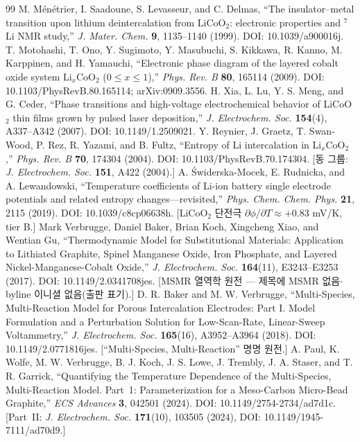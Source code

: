 \begin{thebibliography}{99}
 M. M\'en\'etrier, I. Saadoune, S. Levasseur, and C. Delmas, ``The insulator--metal transition upon lithium deintercalation from LiCoO$_2$: electronic properties and $^7$Li NMR study,'' \emph{J. Mater. Chem.} \textbf{9}, 1135--1140 (1999). DOI: 10.1039/a900016j.
 T. Motohashi, T. Ono, Y. Sugimoto, Y. Masubuchi, S. Kikkawa, R. Kanno, M. Karppinen, and H. Yamauchi, ``Electronic phase diagram of the layered cobalt oxide system Li$_x$CoO$_2$ ($0\le x\le1$),'' \emph{Phys. Rev. B} \textbf{80}, 165114 (2009). DOI: 10.1103/PhysRevB.80.165114; arXiv:0909.3556.
 H. Xia, L. Lu, Y. S. Meng, and G. Ceder, ``Phase transitions and high-voltage electrochemical behavior of LiCoO$_2$ thin films grown by pulsed laser deposition,'' \emph{J. Electrochem. Soc.} \textbf{154}(4), A337--A342 (2007). DOI: 10.1149/1.2509021.
 Y. Reynier, J. Graetz, T. Swan-Wood, P. Rez, R. Yazami, and B. Fultz, ``Entropy of Li intercalation in Li$_x$CoO$_2$,'' \emph{Phys. Rev. B} \textbf{70}, 174304 (2004). DOI: 10.1103/PhysRevB.70.174304. [동 그룹: \emph{J. Electrochem. Soc.} \textbf{151}, A422 (2004).]
 A. {\'S}widerska-Mocek, E. Rudnicka, and A. Lewandowski, ``Temperature coefficients of Li-ion battery single electrode potentials and related entropy changes---revisited,'' \emph{Phys. Chem. Chem. Phys.} \textbf{21}, 2115 (2019). DOI: 10.1039/c8cp06638h. [LiCoO$_2$ 단전극 $\partial\phi/\partial T\approx+0.83$ mV/K, tier B.]
 Mark Verbrugge, Daniel Baker, Brian Koch, Xingcheng Xiao, and Wentian Gu, ``Thermodynamic Model for Substitutional Materials: Application to Lithiated Graphite, Spinel Manganese Oxide, Iron Phosphate, and Layered Nickel-Manganese-Cobalt Oxide,'' \emph{J. Electrochem. Soc.} \textbf{164}(11), E3243--E3253 (2017). DOI: 10.1149/2.0341708jes. [MSMR 열역학 원전 --- 제목에 MSMR 없음$\cdot$byline 이니셜 없음(출판 표기).]
 D. R. Baker and M. W. Verbrugge, ``Multi-Species, Multi-Reaction Model for Porous Intercalation Electrodes: Part I. Model Formulation and a Perturbation Solution for Low-Scan-Rate, Linear-Sweep Voltammetry,'' \emph{J. Electrochem. Soc.} \textbf{165}(16), A3952--A3964 (2018). DOI: 10.1149/2.0771816jes. [``Multi-Species, Multi-Reaction'' 명명 원전.]
 A. Paul, K. Wolfe, M. W. Verbrugge, B. J. Koch, J. S. Lowe, J. Trembly, J. A. Staser, and T. R. Garrick, ``Quantifying the Temperature Dependence of the Multi-Species, Multi-Reaction Model. Part~1: Parameterization for a Meso-Carbon Micro-Bead Graphite,'' \emph{ECS Advances} \textbf{3}, 042501 (2024). DOI: 10.1149/2754-2734/ad7d1c. [Part~II: \emph{J. Electrochem. Soc.} \textbf{171}(10), 103505 (2024), DOI: 10.1149/1945-7111/ad70d9.]

\end{thebibliography}
